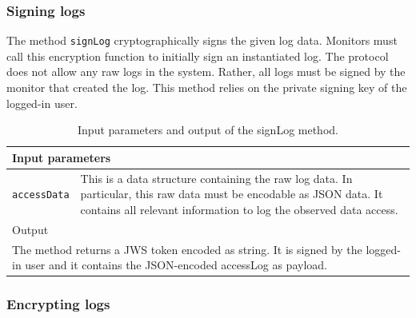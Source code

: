 \documentclass[../main.tex]{subfiles}
\begin{document}
\subsubsection{Signing logs}

The method \verb|signLog| cryptographically signs the given log data.
Monitors must call this encryption function to initially sign an instantiated log.
The protocol does not allow any raw logs in the system.
Rather, all logs must be signed by the monitor that created the log. 
This method relies on the private signing key of the logged-in user.
\begin{table}[ht]
    \centering
    \begin{tabular}{|p{3cm}p{10cm}|}
        \hline
        \multicolumn{2}{|l|}{Input parameters}    \\ \hline
        \verb|accessData|              & This is a data structure containing the raw log data. In particular, this raw data must be encodable as JSON data. It contains all relevant information to log the observed data access.           \\ \hline
        \multicolumn{2}{|l|}{Output}   \\ \hline
        \multicolumn{2}{|p{13cm}|}{The method returns a JWS token encoded as string. It is signed by the logged-in user and it contains the JSON-encoded accessLog as payload.} \\ \hline
    \end{tabular} 
    \caption[Signature of signLog]{Input parameters and output of the signLog method.}
\end{table}

\subsubsection{Encrypting logs}
\end{document}
